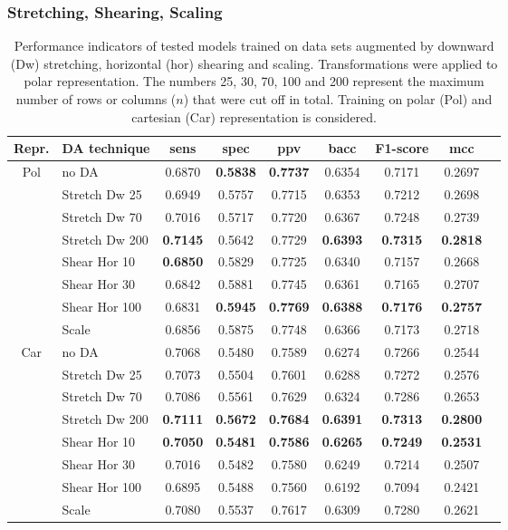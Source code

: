 \subsubsection{Stretching, Shearing, Scaling}

\begin{table}[H]
    \centering
    \begin{tabular}{|c|l|c|c|c|c|c|c|c|}
        \hline
        Repr. & DA technique & \acrshort{sens} & \acrshort{spec} & \acrshort{ppv} & \acrshort{bacc} & F1-score & \acrshort{mcc} \\\hline\hline
        \multirow{8}{2em}{Pol} & no DA & 0.6870 & \textbf{0.5838} & \textbf{0.7737} & 0.6354 & 0.7171 & 0.2697 \\
         & Stretch Dw 25 & 0.6949 & 0.5757 & 0.7715 & 0.6353 & 0.7212 & 0.2698 \\
         & Stretch Dw 70 & 0.7016 & 0.5717 & 0.7720 & 0.6367 & 0.7248 & 0.2739 \\
         & Stretch Dw 200 & \textbf{0.7145} & 0.5642 & 0.7729 & \textbf{0.6393} & \textbf{0.7315} & \textbf{0.2818} \\
         & Shear Hor 10 & \textbf{0.6850} & 0.5829 & 0.7725 & 0.6340 & 0.7157 & 0.2668 \\
         & Shear Hor 30 & 0.6842	& 0.5881 & 0.7745 & 0.6361 & 0.7165 & 0.2707 \\
         & Shear Hor 100 & 0.6831 & \textbf{0.5945} & \textbf{0.7769} & \textbf{0.6388} & \textbf{0.7176} & \textbf{0.2757} \\
         & Scale & 0.6856 & 0.5875 & 0.7748 & 0.6366 & 0.7173 & 0.2718 \\
        \hline
        \multirow{8}{2em}{Car} & no DA & 0.7068 & 0.5480 & 0.7589 & 0.6274 & 0.7266 & 0.2544 \\
         & Stretch Dw 25 & 0.7073 & 0.5504 & 0.7601 & 0.6288 & 0.7272 & 0.2576 \\
         & Stretch Dw 70 & 0.7086 & 0.5561 & 0.7629 & 0.6324 & 0.7286 & 0.2653 \\
         & Stretch Dw 200 & \textbf{0.7111} & \textbf{0.5672} & \textbf{0.7684} & \textbf{0.6391} & \textbf{0.7313} & \textbf{0.2800} \\
         & Shear Hor 10 & \textbf{0.7050} & \textbf{0.5481} & \textbf{0.7586} & \textbf{0.6265} & \textbf{0.7249} & \textbf{0.2531} \\
         & Shear Hor 30 & 0.7016 & 0.5482 & 0.7580 & 0.6249 & 0.7214 & 0.2507 \\
         & Shear Hor 100 & 0.6895 & 0.5488 & 0.7560 & 0.6192 & 0.7094 & 0.2421 \\
         & Scale & 0.7080 & 0.5537 & 0.7617 & 0.6309 & 0.7280 & 0.2621 \\
        \hline
    \end{tabular}
    \caption[Stretching, shearing, scaling]{Performance indicators of tested models trained on data sets augmented by downward (Dw) stretching, horizontal (hor) shearing and scaling. Transformations were applied to polar representation. The numbers 25, 30, 70, 100 and 200 represent the maximum number of rows or columns (\( n \)) that were cut off in total. Training on polar (Pol) and cartesian (Car) representation is considered. }
    \label{tab:str_sh_sc}
\end{table}
